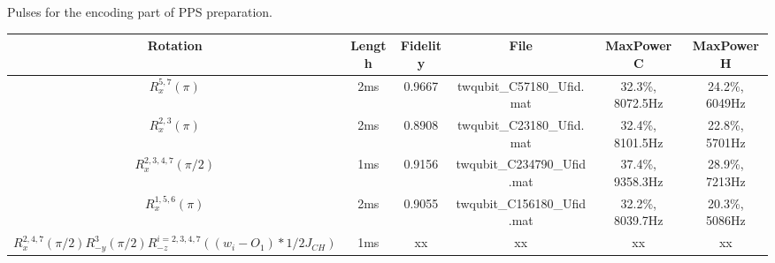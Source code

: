 \documentclass[prl,onecolumn]{revtex4-1}
\begin{document}
Pulses for the encoding part of PPS preparation. 
\begin{table}[hbtp]
\begin{tabular} {c||c|c|c|c|c}
  \hline
  Rotation & Length & Fidelity & File & MaxPower C & MaxPower H\\
  \hline
  $R_x^{5,7}(\pi)$ & 2ms & 0.9667 & twqubit\_C57180\_Ufid.mat & 32.3\%, 8072.5Hz & 24.2\%, 6049Hz\\
  $R_x^{2,3}(\pi)$ & 2ms & 0.8908 & twqubit\_C23180\_Ufid.mat & 32.4\%, 8101.5Hz & 22.8\%, 5701Hz\\
  $R_x^{2,3,4,7}(\pi/2)$ & 1ms & 0.9156 & twqubit\_C234790\_Ufid.mat & 37.4\%, 9358.3Hz & 28.9\%, 7213Hz\\
  $R_x^{1,5,6}(\pi)$ & 2ms & 0.9055 & twqubit\_C156180\_Ufid.mat & 32.2\%, 8039.7Hz & 20.3\%, 5086Hz\\
  $R_x^{2,4,7}(\pi/2)R_{-y}^{3}(\pi/2)R_{-z}^{i=2,3,4,7}((w_i-O_1)*1/2J_{CH})$ & 1ms & xx & xx & xx & xx\\
  \hline
\end{tabular}
\end{table}


\begin{thebibliography}{99}

\end{thebibliography}
\end{document}
